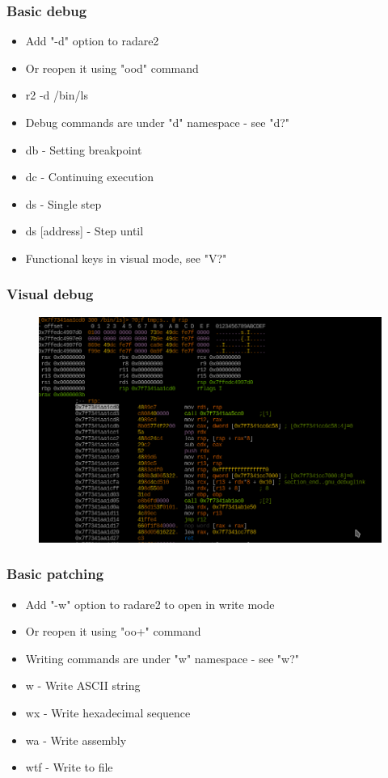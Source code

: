 \documentclass[10pt,pdf,utf8,english,compress,hyperref={unicode}]{beamer}
\begin{document}
\begin{frame}[fragile]
  \frametitle{Basic debug}
  \begin{itemize}
	  \item Add "-d" option to radare2
	  \item Or reopen it using "ood" command
	  \item r2 -d /bin/ls
	  \item Debug commands are under "d" namespace - see "d?"
	  \item db - Setting breakpoint
	  \item dc - Continuing execution
	  \item ds - Single step
	  \item ds [address] - Step until
	  \item Functional keys in visual mode, see "V?"
  \end{itemize}
\end{frame}

\begin{frame}[fragile]
	\frametitle{Visual debug}
	\begin{figure}
		\includegraphics[width=\linewidth]{r2visualdebug.png}
	\end{figure}
\end{frame}

\begin{frame}[fragile]
  \frametitle{Basic patching}
  \begin{itemize}
	  \item Add "-w" option to radare2 to open in write mode
	  \item Or reopen it using "oo+" command
	  \item Writing commands are under "w" namespace - see "w?"
	  \item w - Write ASCII string
	  \item wx - Write hexadecimal sequence
	  \item wa - Write assembly
	  \item wtf - Write to file
  \end{itemize}
\end{frame}
\end{document}
